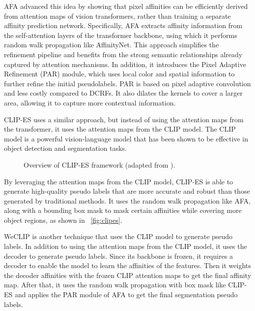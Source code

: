 AFA \cite{wsss_afa_affinity_from_attention} advanced this idea by showing that pixel affinities can be efficiently derived from attention maps of vision transformers, rather than training a separate affinity prediction network. Specifically, AFA extracts affinity information from the self-attention layers of the transformer backbone, using which it performs random walk propagation like AffinityNet. This approach simplifies the refinement pipeline and benefits from the strong semantic relationships already captured by attention mechanisms. In addition, it introduces the Pixel Adaptive Refinement (PAR) module, which uses local color and spatial information to further refine the initial pseudolabels. PAR is based on pixel adaptive convolution and less costly compared to DCRFs. It also dilates the kernels to cover a larger area, allowing it to capture more contextual information.

CLIP-ES \cite{wsss_clip_es} uses a similar approach, but instead of using the attention maps from the transformer, it uses the attention maps from the CLIP model. The CLIP model is a powerful vision-language model that has been shown to be effective in object detection and segmentation tasks. 
\begin{figure}[htbp]
    \centering
    \caption{Overview of CLIP-ES framework (adapted from \cite{wsss_clip_es}).}
    \label{fig:clipes}
\end{figure}
By leveraging the attention maps from the CLIP model, CLIP-ES is able to generate high-quality pseudo labels that are more accurate and robust than those generated by traditional methods. It uses the random walk propagation like AFA, along with a bounding box mask to mask certain affinities while covering more object regions, as shown in ~\autoref{fig:clipes}.

WeCLIP\cite{wsss_frozen_clip} is another technique that uses the CLIP model to generate pseudo labels. In addition to using the attention maps from the CLIP model, it uses the decoder to generate pseudo labels. Since its backbone is frozen, it requires a decoder to enable the model to learn the affinities of the features. Then it weights the decoder affinities with the frozen CLIP attention maps to get the final affinity map. After that, it uses the random walk propagation with box mask like CLIP-ES and applies the PAR module of AFA to get the final segmentation pseudo labels.

